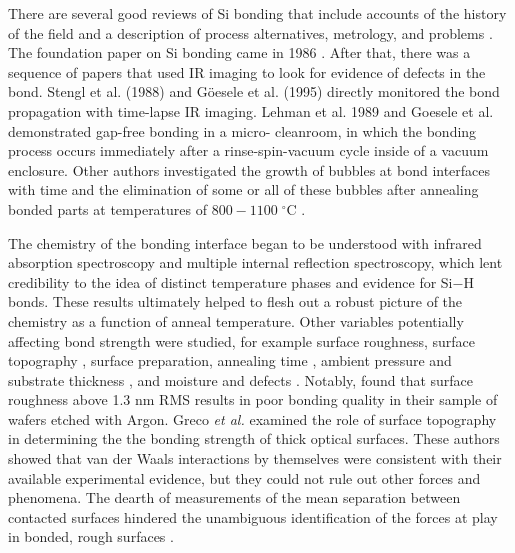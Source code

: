 There are several good reviews of Si bonding that include accounts of the history of the field and a description of process alternatives, metrology, and problems \cite{1998AnRMS..28..215G,Masteika2014}.  The foundation paper on Si bonding came in 1986 \cite{1986JAP....60.2987S}. After that, there was a sequence of papers that used IR imaging to look for evidence of defects in the bond. Stengl et al. (1988) and G{\"o}esele et al. (1995) \cite{1988JaJAP..27L2364S,1995ApPhL..67.3614G} directly monitored the bond propagation with time-lapse IR imaging. Lehman et al. 1989 and Goesele et al. \cite{1989JaJAP..28L2141L,1995ApPhL..67.3614G} demonstrated gap-free bonding in a micro- cleanroom, in which the bonding process occurs immediately after a rinse-spin-vacuum cycle inside of a vacuum enclosure.  Other authors investigated the growth of bubbles at bond interfaces with time and the elimination of some or all of these bubbles after annealing bonded parts at temperatures of $800-1100\;^\circ$C \cite{Horn2009,Masteika2014}.

The chemistry of the bonding interface began to be understood with infrared absorption spectroscopy and multiple internal reflection spectroscopy\cite{feijoo1994}, which lent credibility to the idea of distinct temperature phases and evidence for Si$-$H bonds\cite{1995ApPhA..61..101R}.  These results ultimately helped to flesh out a robust picture of the chemistry as a function of anneal temperature\cite{1996JaJAP..35.2102R,1998AnRMS..28..215G}.  Other variables potentially affecting bond strength were studied, for example surface roughness\cite{JJAP.37.4197}, surface topography \cite{2001JOptA...3...85G}, surface preparation\cite{1996ApPhL..68.2222T}, annealing time \cite{2000JAP....88.4404H}, ambient pressure and substrate thickness \cite{1995ApPhL..67..863G,2007ApOpt..46.6793H}, and moisture and defects \cite{2001JAP....89.6013L}.  Notably, \cite{JJAP.37.4197} found that surface roughness above 1.3 nm RMS results in poor bonding quality in their sample of wafers etched with Argon.  Greco \emph{et al.} examined the role of surface topography in determining the the bonding strength of thick optical surfaces.  These authors showed that van der Waals interactions by themselves were consistent with their available experimental evidence, but they could not rule out other forces and phenomena.  The dearth of measurements of the mean separation between contacted surfaces hindered the unambiguous identification of the forces at play in bonded, rough surfaces \cite{2001JOptA...3...85G}.


